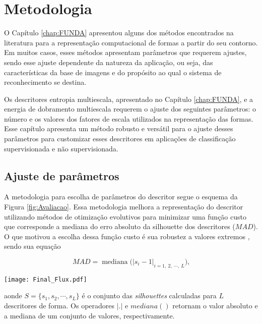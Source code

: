 \chapter{Metodologia}
\label{chap:MatMet}

O Capítulo \ref{chap:FUNDA} apresentou alguns dos métodos encontrados na literatura para a representação computacional de formas a partir do seu contorno.  Em muitos casos, esses métodos apresentam parâmetros que requerem ajustes, sendo esse ajuste dependente da natureza da aplicação, ou seja,  das características da base de imagens e do propósito ao qual o sistema de reconhecimento se destina.

Os descritores entropia multiescala, apresentado no Capítulo \ref{chap:FUNDA}, e a energia de dobramento multiescala requerem o ajuste dos seguintes parâmetros: o número e os valores dos fatores de escala utilizados na representação das formas. Esse capítulo apresenta um método robusto e versátil para o ajuste desses parâmetros para customizar esses descritores em aplicações de classificação supervisionada e não supervisionada.   
 

\section{Ajuste de parâmetros}
A metodologia para escolha de parâmetros do descritor segue o esquema da Figura \ref{fig:Avaliacao}. Essa metodologia melhora a representação do descritor utilizando métodos de otimização evolutivos para minimizar uma função custo que corresponde a mediana do erro absoluto da silhouette dos descritores ($MAD$). O que motivou a escolha dessa função custo é sua robustez a valores extremos \cite{Rousseeuw:1987:2}, sendo sua equação 

\begin{equation}
\label{eq:mad}
MAD = \operatorname{mediana}\big(|s_i - 1|_{i =1,\:2,\:\cdots,\:L}\big)\text{,}
\end{equation}

\begin{figure*}[ht]
\centering
\texttt{[image: Final\_Flux.pdf]}
\caption{Proposta de uma metodologia para otimização e volucionária de um descritor multiescala de forma.} 
\label{fig:Avaliacao}
\end{figure*}

\noindent aonde $S = \{s_1,s_2,\cdots,s_L\}$ é o conjunto das \emph{silhouettes} calculadas para $L$ descritores de forma. Os operadores $|.|$  e {$mediana ( )$} retornam o valor absoluto e a mediana de um conjunto de valores, respectivamente.

